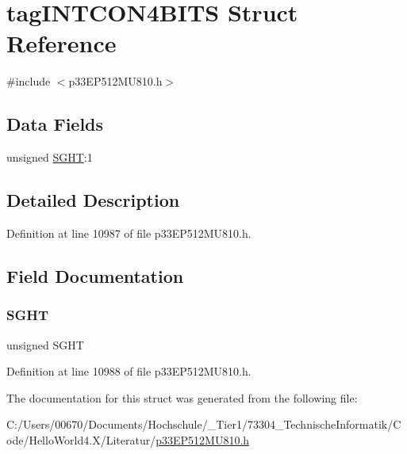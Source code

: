 \hypertarget{structtag_i_n_t_c_o_n4_b_i_t_s}{}\section{tag\+I\+N\+T\+C\+O\+N4\+B\+I\+TS Struct Reference}
\label{structtag_i_n_t_c_o_n4_b_i_t_s}


{\ttfamily \#include $<$p33\+E\+P512\+M\+U810.\+h$>$}

\subsection*{Data Fields}
\begin{DoxyCompactItemize}
\item 
unsigned \hyperlink{structtag_i_n_t_c_o_n4_b_i_t_s_af7d1f4e1cc3f0d22f2c69971173c3c0f}{S\+G\+HT}\+:1
\end{DoxyCompactItemize}


\subsection{Detailed Description}


Definition at line 10987 of file p33\+E\+P512\+M\+U810.\+h.



\subsection{Field Documentation}
\mbox{\label{structtag_i_n_t_c_o_n4_b_i_t_s_af7d1f4e1cc3f0d22f2c69971173c3c0f}} 
\subsubsection{\texorpdfstring{S\+G\+HT}{SGHT}}
{\footnotesize\ttfamily unsigned S\+G\+HT}



Definition at line 10988 of file p33\+E\+P512\+M\+U810.\+h.



The documentation for this struct was generated from the following file\+:\begin{DoxyCompactItemize}
\item 
C\+:/\+Users/00670/\+Documents/\+Hochschule/\+\_\+\+Tier1/73304\+\_\+\+Technische\+Informatik/\+Code/\+Hello\+World4.\+X/\+Literatur/\hyperlink{p33_e_p512_m_u810_8h}{p33\+E\+P512\+M\+U810.\+h}\end{DoxyCompactItemize}
